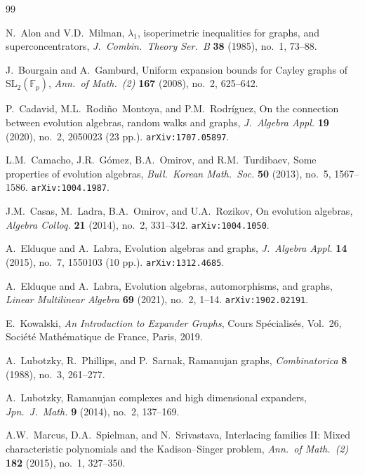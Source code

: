 \documentclass[12pt,a4paper]{amsart}
\theoremstyle{definition}
\begin{document}
\begin{thebibliography}{99}

N.\ Alon and V.D.\ Milman,
$\lambda_1$, isoperimetric inequalities for graphs, and superconcentrators,
\emph{J.\ Combin.\ Theory Ser.\ B} \textbf{38} (1985), no.\ 1, 73--88.

J.\ Bourgain and A.\ Gamburd,
Uniform expansion bounds for Cayley graphs of $\mathrm{SL}_2(\mathbb{F}_p)$,
\emph{Ann.\ of Math.\ (2)} \textbf{167} (2008), no.\ 2, 625--642.

P.\ Cadavid, M.L.\ Rodi\~{n}o~Montoya, and P.M.\ Rodr\'{i}guez,
On the connection between evolution algebras, random walks and graphs,
\emph{J.\ Algebra Appl.} \textbf{19} (2020), no.\ 2, 2050023 (23 pp.).
\texttt{arXiv:1707.05897}.

L.M.\ Camacho, J.R.\ G\'{o}mez, B.A.\ Omirov, and R.M.\ Turdibaev,
Some properties of evolution algebras,
\emph{Bull.\ Korean Math.\ Soc.} \textbf{50} (2013), no.\ 5, 1567--1586.
\texttt{arXiv:1004.1987}.

J.M.\ Casas, M.\ Ladra, B.A.\ Omirov, and U.A.\ Rozikov,
On evolution algebras,
\emph{Algebra Colloq.} \textbf{21} (2014), no.\ 2, 331--342.
\texttt{arXiv:1004.1050}.

A.\ Elduque and A.\ Labra,
Evolution algebras and graphs,
\emph{J.\ Algebra Appl.} \textbf{14} (2015), no.\ 7, 1550103 (10 pp.).
\texttt{arXiv:1312.4685}.

A.\ Elduque and A.\ Labra,
Evolution algebras, automorphisms, and graphs,
\emph{Linear Multilinear Algebra} \textbf{69} (2021), no.\ 2, 1--14.
\texttt{arXiv:1902.02191}.

E.\ Kowalski,
\emph{An Introduction to Expander Graphs},
Cours Sp\'{e}cialis\'{e}s, Vol.\ 26,
Soci\'{e}t\'{e} Math\'{e}matique de France, Paris, 2019.

A.\ Lubotzky, R.\ Phillips, and P.\ Sarnak,
Ramanujan graphs,
\emph{Combinatorica} \textbf{8} (1988), no.\ 3, 261--277.

A.\ Lubotzky,
Ramanujan complexes and high dimensional expanders,
\emph{Jpn.\ J.\ Math.} \textbf{9} (2014), no.\ 2, 137--169.

A.W.\ Marcus, D.A.\ Spielman, and N.\ Srivastava,
Interlacing families II: Mixed characteristic polynomials and the Kadison--Singer problem,
\emph{Ann.\ of Math.\ (2)} \textbf{182} (2015), no.\ 1, 327--350.


\end{thebibliography}
\end{document}

